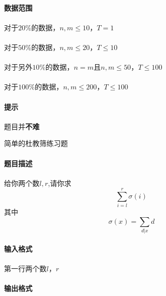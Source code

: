 \documentclass[UTF8]{ctexart}
\begin{document}
\paragraph{数据范围}
\paragraph{}对于$20\%$的数据，$n,m\leq 10$，$T=1$
\paragraph{}对于$50\%$的数据，$n,m\leq 20$，$T\leq 10$
\paragraph{}对于另外$10\%$的数据，$n=m$且$n,m\leq 50$，$T\leq 100$
\paragraph{}对于$100\%$的数据，$n,m\leq 200$，$T\leq 100$

\paragraph{提示}
\paragraph{}题目并\textbf{不难}
\clearpage

\begin{center}
    \large{简单的杜教筛练习题}
\end{center}
\paragraph{题目描述}
\paragraph{}
给你两个数$l,r$,请你求
$$
\sum\limits_{i=l}^r{\sigma(i)}
$$
其中
$$
\sigma(x)=\sum\limits_{d|x} d
$$
\paragraph{输入格式}
\paragraph{}第一行两个数$l$，$r$
\paragraph{输出格式}
\end{document}
